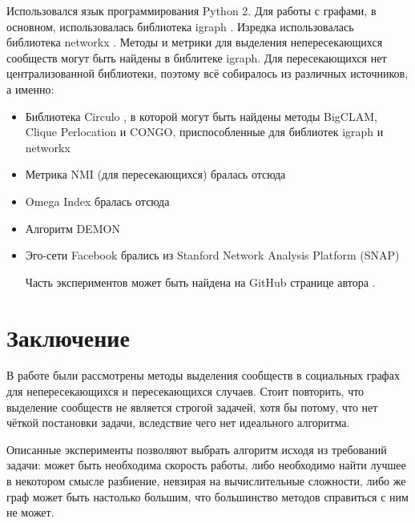 \documentclass[12pt]{article}
\begin{document}
Использовался язык программирования Python 2. Для работы с графами, в основном, использовалась библиотека igraph \cite{igraph}. Изредка использовалась библиотека networkx \cite{networkx}.
Методы и метрики для выделения непересекающихся сообществ могут быть найдены в библитеке igraph. Для пересекающихся нет централизованной библиотеки, поэтому всё собиралось из различных источников, а именно:
\begin{itemize}
\item Библиотека Circulo \cite{circulo}, в которой могут быть найдены методы BigCLAM, Clique Perlocation и CONGO, приспособленные для библиотек igraph и networkx
\item Метрика NMI (для пересекающихся) бралась отсюда \cite{nmi}
\item Omega Index бралась отсюда \cite{omega}
\item Алгоритм DEMON \cite{demon_implementation}
\item Эго-сети Facebook брались из Stanford Network Analysis Platform (SNAP) \cite{snap}

Часть экспериментов может быть найдена на GitHub странице автора \cite{my_github}.
\end{itemize}

\section{Заключение}

В работе были рассмотрены методы выделения сообществ в социальных графах для непересекающихся и пересекающихся случаев. Стоит повторить, что выделение сообществ не является строгой задачей, хотя бы потому, что нет чёткой постановки задачи, вследствие чего нет идеального алгоритма. 

Описанные эксперименты позволяют выбрать алгоритм исходя из требований задачи: может быть необходима скорость работы, либо необходимо найти лучшее в некотором смысле разбиение, невзирая на вычислительные сложности, либо же граф может быть настолько большим, что большинство методов справиться с ним не может. 




\end{document}
